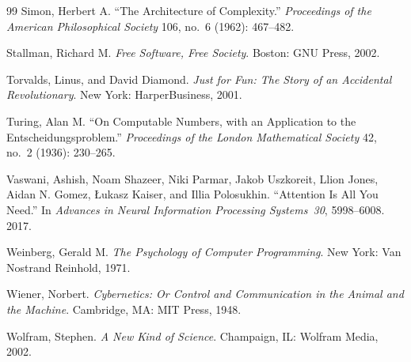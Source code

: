 \documentclass[12pt]{article}
\begin{document}
\begin{thebibliography}{99}
Simon, Herbert A.
``The Architecture of Complexity.''
\textit{Proceedings of the American Philosophical Society} 106, no.~6
(1962): 467--482.

Stallman, Richard M.
\textit{Free Software, Free Society}.
Boston: GNU Press, 2002.

Torvalds, Linus, and David Diamond.
\textit{Just for Fun: The Story of an Accidental Revolutionary}.
New York: HarperBusiness, 2001.

Turing, Alan M.
``On Computable Numbers, with an Application to the Entscheidungsproblem.''
\textit{Proceedings of the London Mathematical Society} 42, no.~2
(1936): 230--265.

Vaswani, Ashish, Noam Shazeer, Niki Parmar, Jakob Uszkoreit,
Llion Jones, Aidan N. Gomez, {\L}ukasz Kaiser, and Illia Polosukhin.
``Attention Is All You Need.''
In \textit{Advances in Neural Information Processing Systems~30},
5998--6008.
2017.

Weinberg, Gerald M.
\textit{The Psychology of Computer Programming}.
New York: Van Nostrand Reinhold, 1971.

Wiener, Norbert.
\textit{Cybernetics: Or Control and Communication in the Animal and the Machine}.
Cambridge, MA\@: MIT Press, 1948.

Wolfram, Stephen.
\textit{A New Kind of Science}.
Champaign, IL\@: Wolfram Media, 2002.

\end{thebibliography}
\end{document}
